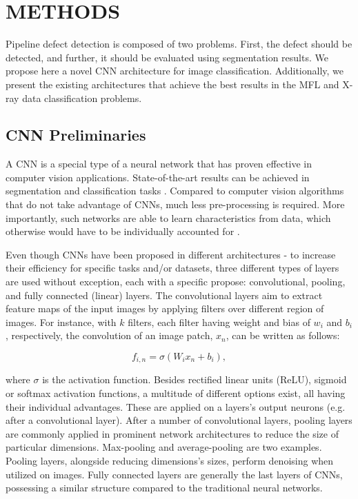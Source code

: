 \section{METHODS}
\label{METHODS}
Pipeline defect detection is composed of two problems. First, the defect should be detected, and further, it should be evaluated using segmentation results.
We propose here a novel CNN architecture for image classification.
Additionally, we present the existing architectures that achieve the best results in the MFL and X-ray data classification problems.

\subsection{CNN Preliminaries}

A CNN is a special type of a neural network that has proven  effective in computer vision applications. State-of-the-art results can be achieved in segmentation and classification tasks \cite{a10}. Compared to computer vision algorithms that do not take advantage of CNNs, much less pre-processing is required. More importantly, such networks are able to learn characteristics from data, which otherwise would have to be individually accounted for \cite{a11}.

Even though CNNs have been proposed in different architectures - to increase their efficiency for specific tasks and/or datasets, three different types of layers are used without exception, each with a specific propose: convolutional, pooling, and fully connected (linear) layers. The convolutional layers aim to extract feature maps of the input images by applying filters over different region of images. For instance, with $k$ filters, each filter having weight and bias of $w_i$ and $b_i$, respectively, the convolution of an image patch, $x_n$, can be written as follows:

\begin{equation}
f_{i,n}=\sigma(W_ix_n+b_i),
\end{equation}

where $\sigma$ is the activation function. Besides rectified linear units (ReLU), sigmoid or softmax activation functions, a multitude of different options exist, all having their individual advantages. These are applied on a layers's output neurons (e.g. after a convolutional layer).
After a number of convolutional layers, pooling layers are commonly applied in prominent network architectures to reduce the size of particular dimensions. Max-pooling and average-pooling are two examples. Pooling layers, alongside reducing dimensions's sizes, perform denoising when utilized on images. 
Fully connected layers are generally the last layers of CNNs, possessing a similar structure compared to the traditional neural networks\cite{a12}.

